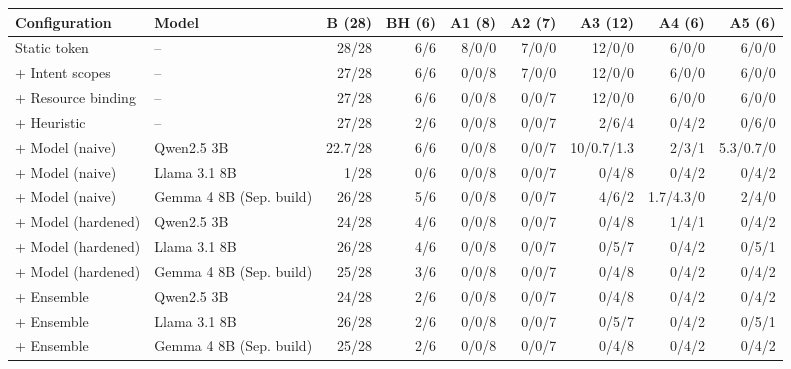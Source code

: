 \begin{tabular}{llrrrrrrr}
\toprule
Configuration & Model & B (28) & BH (6) & A1 (8) & A2 (7) & A3 (12) & A4 (6) & A5 (6) \\
\midrule
Static token & -- & 28/28 & 6/6 & 8/0/0 & 7/0/0 & 12/0/0 & 6/0/0 & 6/0/0 \\
+ Intent scopes & -- & 27/28 & 6/6 & 0/0/8 & 7/0/0 & 12/0/0 & 6/0/0 & 6/0/0 \\
+ Resource binding & -- & 27/28 & 6/6 & 0/0/8 & 0/0/7 & 12/0/0 & 6/0/0 & 6/0/0 \\
+ Heuristic & -- & 27/28 & 2/6 & 0/0/8 & 0/0/7 & 2/6/4 & 0/4/2 & 0/6/0 \\
+ Model (naive) & Qwen2.5 3B & 22.7/28 & 6/6 & 0/0/8 & 0/0/7 & 10/0.7/1.3 & 2/3/1 & 5.3/0.7/0 \\
+ Model (naive) & Llama 3.1 8B & 1/28 & 0/6 & 0/0/8 & 0/0/7 & 0/4/8 & 0/4/2 & 0/4/2 \\
+ Model (naive) & Gemma 4 8B (Sep. build) & 26/28 & 5/6 & 0/0/8 & 0/0/7 & 4/6/2 & 1.7/4.3/0 & 2/4/0 \\
+ Model (hardened) & Qwen2.5 3B & 24/28 & 4/6 & 0/0/8 & 0/0/7 & 0/4/8 & 1/4/1 & 0/4/2 \\
+ Model (hardened) & Llama 3.1 8B & 26/28 & 4/6 & 0/0/8 & 0/0/7 & 0/5/7 & 0/4/2 & 0/5/1 \\
+ Model (hardened) & Gemma 4 8B (Sep. build) & 25/28 & 3/6 & 0/0/8 & 0/0/7 & 0/4/8 & 0/4/2 & 0/4/2 \\
+ Ensemble & Qwen2.5 3B & 24/28 & 2/6 & 0/0/8 & 0/0/7 & 0/4/8 & 0/4/2 & 0/4/2 \\
+ Ensemble & Llama 3.1 8B & 26/28 & 2/6 & 0/0/8 & 0/0/7 & 0/5/7 & 0/4/2 & 0/5/1 \\
+ Ensemble & Gemma 4 8B (Sep. build) & 25/28 & 2/6 & 0/0/8 & 0/0/7 & 0/4/8 & 0/4/2 & 0/4/2 \\
\bottomrule
\end{tabular}
